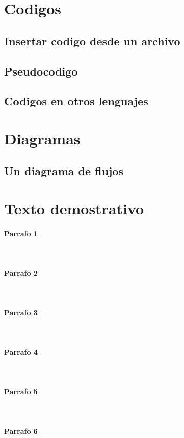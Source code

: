 \documentclass[12pt,a4paper,oneside]{article}
\title{\titulodoc}
\author{\autordoc}
\date{\fechadoc}
\begin{document}
\maketitle
\section{Codigos}
\subsection{Insertar codigo desde un archivo}
\subsection{Pseudocodigo}
\newpage
\subsection{Codigos en otros lenguajes}
\newpage


\section{Diagramas}
\subsection{Un diagrama de flujos}
\vspace{2cm}

\newpage
\section{Texto demostrativo}
\paragraph{Parrafo 1}
\lipsum[1]\\
\paragraph{Parrafo 2}
\lipsum[2]\\
\paragraph{Parrafo 3}
\lipsum[3]\\
\paragraph{Parrafo 4}
\lipsum[4]\\
\paragraph{Parrafo 5}
\lipsum[5]\\
\paragraph{Parrafo 6}
\lipsum[6]\\
\end{document}

